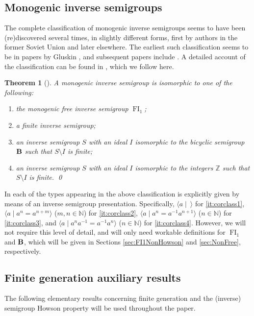 \documentclass[reqno]{amsart}
\theoremstyle{plain}
\newtheorem{thm}[lem]{Theorem}
\theoremstyle{definition}
\DeclareMathOperator{\FI}{FI}
\DeclareMathOperator{\B}{\textup{\textbf{B}}}
\newenvironment{thmenumerate}{\begin{enumerate}[topsep=0mm, leftmargin=14mm,itemsep=1mm,label=\textup{(\roman*)}]
}{\end{enumerate}}
\numberwithin{equation}{section}
\begin{document}
\subsection{Monogenic inverse semigroups} 
The complete classification of monogenic inverse semigroups seems to have been (re)discovered several times, in slightly different forms, 
first by authors in the former Soviet Union and later elsewhere.
The earliest such classification seems to be in papers by Gluskin \cite{Gluskin57,Gluskin61,Gluskin63}, and subsequent papers include \cite{Ershova71,Djadcenko73,Djadcenko74,Eberhart72,Conway84,Preston86}. 
A detailed account of the classification can be found in
\cite[Chapter IX]{Petrich}, 
which we follow here.


\begin{thm}[{\cite[Chapter IX]{Petrich}}]
\label{thm:MonoClass1}
A monogenic inverse semigroup is isomorphic to one of the following:
\begin{thmenumerate}
    \item \label{it:corclass1} the monogenic free inverse semigroup $\FI_1$;
    \item \label{it:corclass2} a finite inverse semigroup;
    \item \label{it:corclass3} an inverse semigroup $S$ with an ideal $I$ isomorphic to the bicyclic semigroup $\B$ such that $S\setminus I$ is finite;
    \item \label{it:corclass4} an inverse semigroup $S$ with an ideal $I$ isomorphic to the integers $\mathbb{Z}$ such that $S\setminus I$ is finite. \hfill\qed
\end{thmenumerate}
\end{thm}


In \cite[Theorem IX.3.11]{Petrich} each of the types appearing in the above classification
is explicitly given by means of an inverse semigroup presentation. Specifically, $\langle a\mid \ \rangle$ for \ref{it:corclass1},
$\langle a\mid a^n = a^{n+m} \rangle$ ($m,n\in\mathbb{N}$) for \ref{it:corclass2},
$\langle a\mid a^n = a^{-1}a^{n+1} \rangle$ ($n\in\mathbb{N}$) for \ref{it:corclass3}, and
$\langle a\mid a^na^{-1} = a^{-1}a^{n} \rangle$ ($n\in\mathbb{N}$) for \ref{it:corclass4}.
However, we will not require this level of detail, and will only need workable definitions for $\FI_1$ and $\B$, which will be given in Sections \ref{sec:FI1NonHowson} and \ref{sec:NonFree}, respectively.

\subsection{Finite generation auxiliary results} The following elementary results concerning finite generation and the (inverse) semigroup Howson property will be used throughout the paper. 
\end{document}
